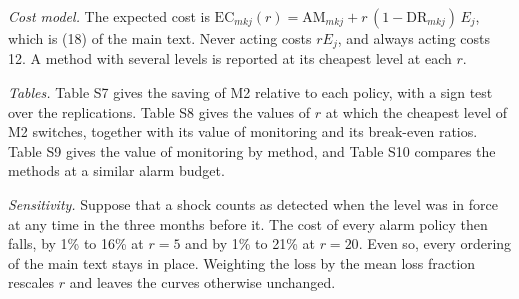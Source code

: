 \documentclass[10pt,a4paper]{article}
\begin{document}
\textit{Cost model.} The expected cost is $\mathrm{EC}_{mkj}(r) = \mathrm{AM}_{mkj} + r\,(1-\mathrm{DR}_{mkj})\,E_{j}$, which is (18) of the main text. Never acting costs $rE_{j}$, and always acting costs 12. A method with several levels is reported at its cheapest level at each $r$.

\textit{Tables.} Table S7 gives the saving of M2 relative to each policy, with a sign test over the replications. Table S8 gives the values of $r$ at which the cheapest level of M2 switches, together with its value of monitoring and its break-even ratios. Table S9 gives the value of monitoring by method, and Table S10 compares the methods at a similar alarm budget.

\textit{Sensitivity.} Suppose that a shock counts as detected when the level was in force at any time in the three months before it. The cost of every alarm policy then falls, by 1\% to 16\% at $r = 5$ and by 1\% to 21\% at $r = 20$. Even so, every ordering of the main text stays in place. Weighting the loss by the mean loss fraction rescales $r$ and leaves the curves otherwise unchanged.
\end{document}
